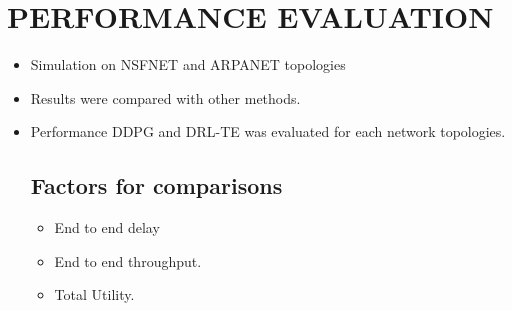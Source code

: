 
\section{ PERFORMANCE EVALUATION}
\label{sec:pet-peeves}

\begin{itemize}

\item Simulation on NSFNET and ARPANET topologies
\item Results were compared with other methods.
\item Performance DDPG and DRL-TE was evaluated for each network topologies.

\subsection{Factors for comparisons}
\label{sec:orgheadline1}
\begin{itemize}

\item End to end delay
\item End to end throughput.
\item Total Utility.

\end{itemize}

\end{itemize}